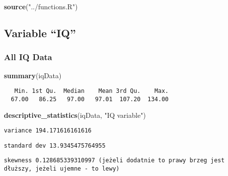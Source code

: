 \documentclass[]{article}
\newenvironment{Shaded}{\begin{snugshade}}{\end{snugshade}}
\newcommand{\KeywordTok}[1]{\textcolor[rgb]{0.13,0.29,0.53}{\textbf{{#1}}}}
\newcommand{\StringTok}[1]{\textcolor[rgb]{0.31,0.60,0.02}{{#1}}}
\newcommand{\NormalTok}[1]{{#1}}
\begin{document}
\begin{Shaded}
\begin{Highlighting}[]
\KeywordTok{source}\NormalTok{(}\StringTok{"../functions.R"}\NormalTok{)}
\end{Highlighting}
\end{Shaded}

\subsection{\texorpdfstring{Variable
``IQ''}{Variable IQ}}\label{variable-iq}

\subsubsection{All IQ Data}\label{all-iq-data}

\begin{Shaded}
\end{Shaded}

\begin{Shaded}
\begin{Highlighting}[]
\KeywordTok{summary}\NormalTok{(iqData)}
\end{Highlighting}
\end{Shaded}

\begin{verbatim}
   Min. 1st Qu.  Median    Mean 3rd Qu.    Max. 
  67.00   86.25   97.00   97.01  107.20  134.00 
\end{verbatim}

\begin{Shaded}
\begin{Highlighting}[]
\KeywordTok{descriptive_statistics}\NormalTok{(iqData, }\StringTok{"IQ variable"}\NormalTok{)}
\end{Highlighting}
\end{Shaded}

\begin{verbatim}
variance 194.171616161616
\end{verbatim}

\begin{verbatim}
standard dev 13.9345475764955
\end{verbatim}

\begin{verbatim}
skewness 0.128685339310997 (jeżeli dodatnie to prawy brzeg jest dłuższy, jeżeli ujemne - to lewy)
\end{verbatim}
\end{document}
